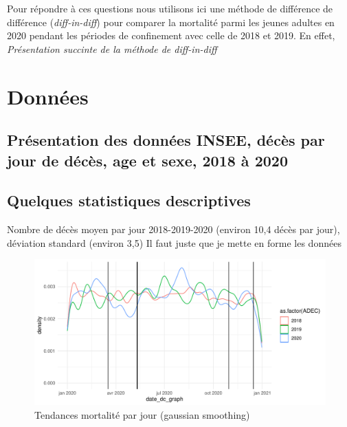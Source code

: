 \documentclass{article}
\begin{document}
Pour répondre à ces questions nous utilisons ici une méthode de différence de différence (\textit{diff-in-diff}) pour comparer la mortalité parmi les jeunes adultes en 2020 pendant les périodes de confinement avec celle de 2018 et 2019. En effet, \textit{Présentation succinte de la méthode de diff-in-diff} %



\section{Données}

\subsection{Présentation des données INSEE, décès par jour de décès, age et sexe, 2018 à 2020}




\subsection{Quelques statistiques descriptives}





Nombre de décès moyen par jour 2018-2019-2020 (environ 10,4 décès par jour), déviation standard (environ 3,5)
Il faut juste que je mette en forme les données


\begin{center}
\begin{figure}[h!]
\caption{\label{Graph_descr}Tendances mortalité par jour (gaussian smoothing)}
\includegraphics{Aussant_Forcadell_Sessego-003}
\end{figure}
\end{center}
\end{document}
